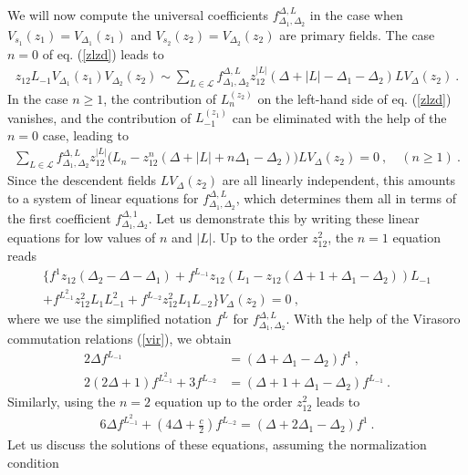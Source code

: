 \documentclass[12pt,a4paper,notitlepage]{report}
\numberwithin{equation}{section}
\theoremstyle{break}
\begin{document}
We will now compute the universal coefficients $f_{\Delta_1,\Delta_2}^{\Delta,L}$ in 
the case when $V_{s_1}(z_1)=V_{\Delta_1}(z_1)$ and $V_{s_2}(z_2)=V_{\Delta_2}(z_2)$ are primary fields. The case $n=0$ of eq. (\ref{zlzd}) leads to
\begin{align}
 z_{12}L_{-1}V_{\Delta_1}(z_1) V_{\Delta_2}(z_2) \sim \sum_{L\in \mathcal{L}} f_{\Delta_1,\Delta_2}^{\Delta,L} z_{12}^{|L|} 
(\Delta+|L|-\Delta_1-\Delta_2) LV_\Delta(z_2)\ .
\label{zot}
\end{align}
In the case $n\geq 1$, the contribution of $L_n^{(z_2)}$ on the left-hand side of eq. (\ref{zlzd}) vanishes, and the contribution of $L_{-1}^{(z_1)}$ can be eliminated with the help of the $n=0$ case, leading to
\begin{align}
 \sum_{L\in \mathcal{L}}f_{\Delta_1,\Delta_2}^{\Delta,L} z_{12}^{|L|} \big(L_n-z_{12}^n(\Delta+|L|+n\Delta_1-\Delta_2)\big) LV_\Delta(z_2) = 0\ , \quad (n\geq 1)\ .
\label{sll}
\end{align}
Since the descendent fields $LV_\Delta(z_2)$ are all linearly independent, this amounts to a system of linear equations for $f_{\Delta_1,\Delta_2}^{\Delta,L}$, which determines them all in terms of the first coefficient $f_{\Delta_1,\Delta_2}^{\Delta,1}$. Let us demonstrate this by writing these linear equations for low values of $n$ and $|L|$. Up to the order $z_{12}^2$, the $n=1$ equation reads 
\begin{multline}
 \Big\{f^1 z_{12}(\Delta_2-\Delta-\Delta_1) +f^{L_{-1}} z_{12}\left(L_1-z_{12}(\Delta+1+\Delta_1-\Delta_2)\right)L_{-1}  
\\ 
+ f^{L_{-1}^2}z_{12}^2 L_1L_{-1}^2 +  f^{L_{-2}}z_{12}^2 L_1L_{-2}\Big\} V_{\Delta}(z_2) = 0\ ,
\end{multline}
where we use the simplified notation $f^L $ for  $f_{\Delta_1,\Delta_2}^{\Delta,L}$. With the help of the Virasoro commutation relations (\ref{vir}), we obtain 
\begin{align}
 2\Delta f^{L_{-1}} &= (\Delta+\Delta_1-\Delta_2) f^1 \ ,
\label{flfo}
\\
 2(2\Delta+1) f^{L_{-1}^2} + 3 f^{L_{-2}} & = (\Delta+1+\Delta_1-\Delta_2) f^{L_{-1}}\ .
\end{align}
Similarly, using the $n=2$ equation up to the order $z_{12}^2$ leads to 
\begin{align}
 6\Delta f^{L_{-1}^2} + (4\Delta+\tfrac{c}{2})f^{L_{-2}} = (\Delta+2\Delta_1-\Delta_2) f^1\ .
\end{align}
Let us discuss the solutions of these equations, assuming the normalization condition 
\end{document}
